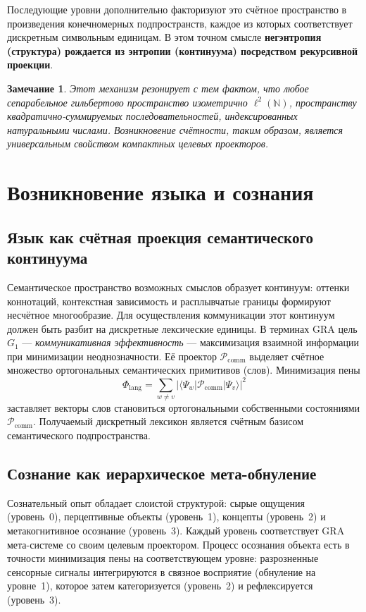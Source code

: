 \documentclass[11pt]{article}
\newtheorem{remark}[theorem]{Замечание}
\newcommand{\cP}{\mathcal{P}}
\begin{document}
Последующие уровни дополнительно факторизуют это счётное пространство в произведения конечномерных подпространств, каждое из которых соответствует дискретным символьным единицам. В этом точном смысле \textbf{негэнтропия (структура) рождается из энтропии (континуума) посредством рекурсивной проекции}.

\begin{remark}
Этот механизм резонирует с тем фактом, что любое сепарабельное гильбертово пространство изометрично $\ell^2(\mathbb{N})$, пространству квадратично-суммируемых последовательностей, индексированных натуральными числами. Возникновение счётности, таким образом, является универсальным свойством компактных целевых проекторов.
\end{remark}

\section{Возникновение языка и сознания}
\label{sec:emergence}

\subsection{Язык как счётная проекция семантического континуума}
Семантическое пространство возможных смыслов образует континуум: оттенки коннотаций, контекстная зависимость и расплывчатые границы формируют несчётное многообразие. Для осуществления коммуникации этот континуум должен быть разбит на дискретные лексические единицы. В терминах GRA цель $G_1$ --- \emph{коммуникативная эффективность} --- максимизация взаимной информации при минимизации неоднозначности. Её проектор $\cP_{\text{comm}}$ выделяет счётное множество ортогональных семантических примитивов (слов). Минимизация пены
\[
\Phi_{\text{lang}} = \sum_{w \neq v} \bigl| \langle \Psi_w | \cP_{\text{comm}} | \Psi_v \rangle \bigr|^2
\]
заставляет векторы слов становиться ортогональными собственными состояниями $\cP_{\text{comm}}$. Получаемый дискретный лексикон является счётным базисом семантического подпространства.

\subsection{Сознание как иерархическое мета-обнуление}
Сознательный опыт обладает слоистой структурой: сырые ощущения (уровень~0), перцептивные объекты (уровень~1), концепты (уровень~2) и метакогнитивное осознание (уровень~3). Каждый уровень соответствует GRA мета-системе со своим целевым проектором. Процесс осознания объекта есть в точности минимизация пены на соответствующем уровне: разрозненные сенсорные сигналы интегрируются в связное восприятие (обнуление на уровне~1), которое затем категоризуется (уровень~2) и рефлексируется (уровень~3).
\end{document}

